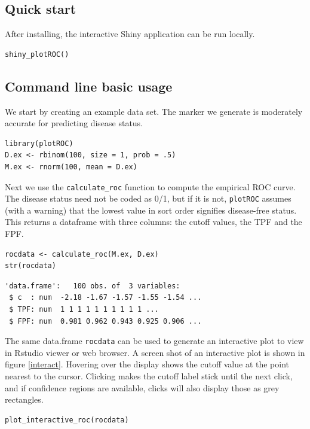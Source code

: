 \documentclass[article]{jss}
\begin{document}
\subsection{Quick start}\label{quick-start}

After installing, the interactive Shiny application can be run locally.

\begin{verbatim}
shiny_plotROC()
\end{verbatim}

\subsection{Command line basic usage}\label{command-line-basic-usage}

We start by creating an example data set. The marker we generate is
moderately accurate for predicting disease status.

\begin{verbatim}
library(plotROC)
D.ex <- rbinom(100, size = 1, prob = .5)
M.ex <- rnorm(100, mean = D.ex)
\end{verbatim}

Next we use the \texttt{calculate\_roc} function to compute the
empirical ROC curve. The disease status need not be coded as 0/1, but if
it is not, \texttt{plotROC} assumes (with a warning) that the lowest
value in sort order signifies disease-free status. This returns a
dataframe with three columns: the cutoff values, the TPF and the FPF.

\begin{verbatim}
rocdata <- calculate_roc(M.ex, D.ex)
str(rocdata)
\end{verbatim}

\begin{verbatim}
'data.frame':   100 obs. of  3 variables:
 $ c  : num  -2.18 -1.67 -1.57 -1.55 -1.54 ...
 $ TPF: num  1 1 1 1 1 1 1 1 1 1 ...
 $ FPF: num  0.981 0.962 0.943 0.925 0.906 ...
\end{verbatim}

The same data.frame \texttt{rocdata} can be used to generate an
interactive plot to view in Rstudio viewer or web browser. A screen shot
of an interactive plot is shown in figure \ref{interact}. Hovering over
the display shows the cutoff value at the point nearest to the cursor.
Clicking makes the cutoff label stick until the next click, and if
confidence regions are available, clicks will also display those as grey
rectangles.

\begin{verbatim}
plot_interactive_roc(rocdata)
\end{verbatim}
\end{document}
